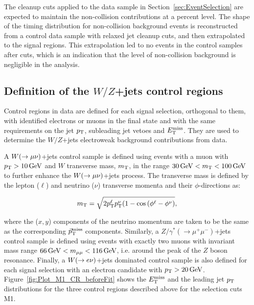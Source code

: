 The cleanup cuts applied to the data sample in Section~\ref{sec:EventSelection} are expected to maintain the non-collision contributions at a percent level.
The shape of the timing distribution for non-collision background events is reconstructed from a control data sample with relaxed jet cleanup cuts, and then extrapolated to the signal regions.
This extrapolation led to no events in the control samples after cuts, which is an indication that the level of non-collision background is negligible in the analysis.


\subsection{Definition of the $W/Z$+jets control regions}
    \label{subsec:ControlRegionsDefinition}

Control regions in data are defined for each signal selection, orthogonal to them, with identified electrons or muons in the final state and with the same requirements on the jet $p_{\mathrm{T}}$, subleading jet vetoes and $E_{\mathrm{T}}^{\mathrm{miss}}$.
They are used to determine the $W/Z$+jets electroweak background contributions from data.

A $W(\rightarrow \mu \nu)$+jets control sample is defined using events with a muon with $\pt>\unit[10]{GeV}$ and $W$ transverse mass, $m_{\mathrm{T}}$, in the range $\unit[30]{GeV} < \mt < \unit[100]{GeV}$ to further enhance the $W(\rightarrow \mu \nu)$+jets process.
The transverse mass is defined by the lepton ($\ell$) and neutrino ($\nu$) transverse momenta and their $\phi$-directions as:

\begin{equation}
\mt = \sqrt{ 2\pt^{\ell}\pt^{\nu}(1-\cos{(\phi^{\ell}-\phi^{\nu})}},
\label{eq:TransverseMassDef}
\end{equation}

\noindent where the ($x, y$) components of the neutrino momentum are taken to be the same as the corresponding $\vec{p}_{\mathrm{T}}^{\mathrm{miss}}$ components.
Similarly, a $Z/\gamma^{\ast}(\rightarrow \mu^{+}\mu^{-})$+jets control sample is defined using events with exactly two muons with invariant mass range $\unit[66]{GeV}<m_{\mu\mu}<\unit[116]{GeV}$, i.e. around the peak of the $Z$ boson resonance.
Finally, a $W(\rightarrow e \nu)$+jets dominated control sample is also defined for each signal selection with an electron candidate with $\pt>\unit[20]{GeV}$.
Figure~\ref{fig:Plot_M1_CR_beforeFit} shows the $E_{\mathrm{T}}^{\mathrm{miss}}$ and the leading jet $p_{\mathrm{T}}$ distributions for the three control regions described above for the selection cuts M1.


